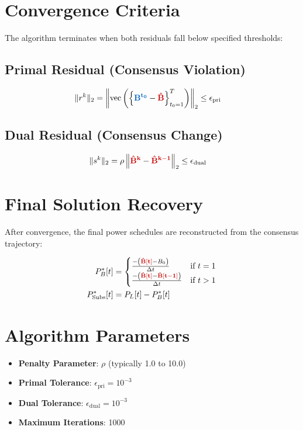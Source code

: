 \documentclass[11pt]{article}
\newcommand{\blueB}[1]{\textcolor{bluevar}{\mathbf{#1}}}      %
\newcommand{\redBhat}[1]{\textcolor{redvar}{\mathbf{#1}}}     %
\begin{document}
\section{Convergence Criteria}

The algorithm terminates when both residuals fall below specified thresholds:

\subsection{Primal Residual (Consensus Violation)}
\begin{align}
\|r^k\|_2 &= \left\| \text{vec}\left( \left\{ \blueB{B^{t_0}} - \redBhat{\hat{B}} \right\}_{t_0=1}^T \right) \right\|_2 \leq \epsilon_{\text{pri}}
\end{align}

\subsection{Dual Residual (Consensus Change)}
\begin{align}
\|s^k\|_2 &= \rho \left\| \redBhat{\hat{B}^k} - \redBhat{\hat{B}^{k-1}} \right\|_2 \leq \epsilon_{\text{dual}}
\end{align}

\section{Final Solution Recovery}

After convergence, the final power schedules are reconstructed from the consensus trajectory:

\begin{align}
P_{B}^*[t] &= 
\begin{cases}
\frac{-\left(\redBhat{\hat{B}[t]} - B_0\right)}{\Delta t} & \text{if } t = 1 \\
\frac{-\left(\redBhat{\hat{B}[t]} - \redBhat{\hat{B}[t-1]}\right)}{\Delta t} & \text{if } t > 1
\end{cases} \\
P_{\text{Subs}}^*[t] &= P_L[t] - P_{B}^*[t]
\end{align}

\section{Algorithm Parameters}

\begin{itemize}
    \item \textbf{Penalty Parameter}: $\rho$ (typically 1.0 to 10.0)
    \item \textbf{Primal Tolerance}: $\epsilon_{\text{pri}} = 10^{-3}$
    \item \textbf{Dual Tolerance}: $\epsilon_{\text{dual}} = 10^{-3}$
    \item \textbf{Maximum Iterations}: 1000
\end{itemize}
\end{document}
